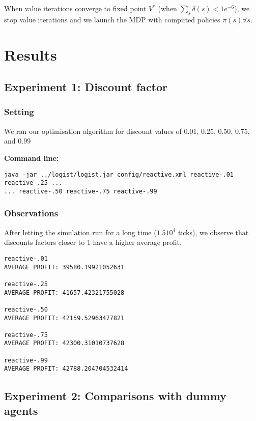 \documentclass[11pt]{article}
\begin{document}
When value iterations converge to fixed point $V^*$ (when $\sum_s \delta(s) < 1e^{-6}$), we stop value iterations and we launch the MDP with computed policies $\pi(s) \forall s$.

\section{Results}

\subsection{Experiment 1: Discount factor}

\subsubsection{Setting}
We ran our optimisation algorithm for discount values of $0.01$, $0.25$, $0.50$, $0.75$, and $0.99$

\textbf{Command line:}
\begin{verbatim}
java -jar ../logist/logist.jar config/reactive.xml reactive-.01 reactive-.25 ... 
... reactive-.50 reactive-.75 reactive-.99
\end{verbatim}

\subsubsection{Observations}
After letting the simulation run for a long time ($1.5 10^4$ ticks), we observe that discounts factors closer to 1 have a higher average profit.
\begin{verbatim}
reactive-.01
AVERAGE PROFIT: 39580.19921052631

reactive-.25
AVERAGE PROFIT: 41657.42321755028

reactive-.50 
AVERAGE PROFIT: 42159.52963477821

reactive-.75
AVERAGE PROFIT: 42300.31010737628

reactive-.99
AVERAGE PROFIT: 42788.204704532414
\end{verbatim}

\subsection{Experiment 2: Comparisons with dummy agents}
\end{document}
